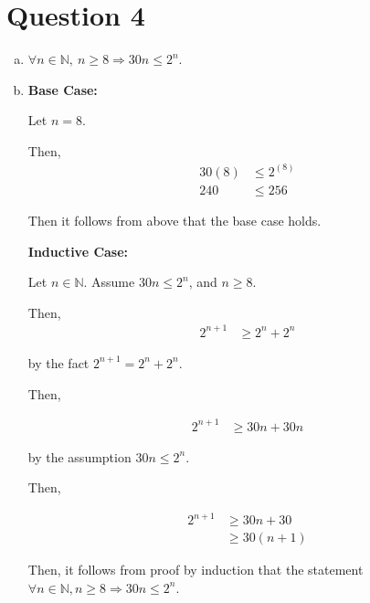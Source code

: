 \documentclass[12pt]{article}
\begin{document}
\section*{Question 4}
\begin{enumerate}[a.]
    \item $\forall n \in \mathbb{N},\:n \geq 8 \Rightarrow 30n \leq 2^n$.

    \item

    \textbf{Base Case:}

    \bigskip

    Let $n = 8$.

    \bigskip

    Then,
    \setcounter{equation}{0}
    \begin{align}
        30(8) &\leq 2^{(8)}\\
        240 &\leq 256
    \end{align}

    Then it follows from above that the base case holds.

    \bigskip

    \textbf{Inductive Case:}

    \bigskip

    Let $n \in \mathbb{N}$. Assume $30n \leq 2^n$, and $n \geq 8$.

    \bigskip

    Then,
    \setcounter{equation}{0}
    \begin{align}
        2^{n+1} &\geq 2^n + 2^n
    \end{align}

    by the fact $2^{n+1} = 2^n + 2^n$.

    \bigskip

    Then,

    \begin{align}
        2^{n+1} &\geq 30n + 30n
    \end{align}

    by the assumption $30n \leq 2^n$.

    \bigskip

    Then,

    \begin{align}
        2^{n+1} &\geq 30n + 30\\
        &\geq 30(n+1)
    \end{align}

    \bigskip

    Then, it follows from proof by induction that the statement $\forall n \in
    \mathbb{N}, n \geq 8 \Rightarrow 30n \leq 2^n$.

\end{enumerate}
\end{document}
